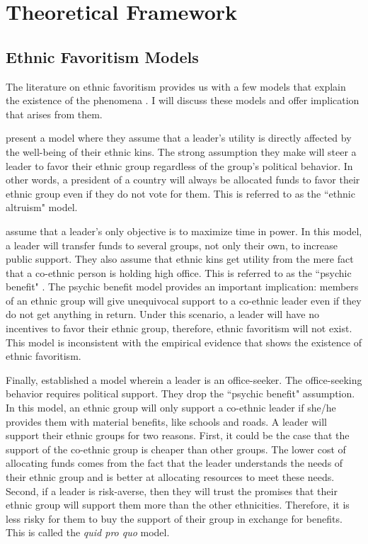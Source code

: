 \documentclass{wptemp}
\begin{document}
\section{Theoretical Framework}\label{sec1}
\subsection{Ethnic Favoritism Models}
The literature on ethnic favoritism provides us with a few models that explain the existence of the phenomena \citep{cox1986electoral, dixit1996determinants, lindbeck1987balanced}. I will discuss these models and offer implication that arises from them.

\citet{cox1986electoral} present a  model where they assume that a leader's utility is directly affected by the well-being of their ethnic kins. The strong assumption they make will steer a leader to favor their ethnic group regardless of the group's political behavior. In other words, a president of a country will always be allocated funds to favor their ethnic group even if they do not vote for them. This is referred to as the ``ethnic altruism" model.

\citet{dixit1996determinants} assume that a leader's only objective is to maximize time in power. In this model, a leader will transfer funds to several groups, not only their own, to increase public support. They also assume that ethnic kins get utility from the mere fact that a co-ethnic person is holding high office. This is referred to as the ``psychic benefit" \citep{chandra2007ethnic}. The psychic benefit model provides an important implication: members of an ethnic group will give unequivocal support to a co-ethnic leader even if they do not get anything in return. Under this scenario, a leader will have no incentives to favor their ethnic group, therefore, ethnic favoritism will not exist. This model is inconsistent with the empirical evidence that shows the existence of ethnic favoritism.

Finally, \citet{lindbeck1987balanced} established a model wherein a leader is an office-seeker. The office-seeking behavior requires political support. They drop the ``psychic benefit" assumption. In this model, an ethnic group will only support a co-ethnic leader if she/he provides them with material benefits, like schools and roads. A leader will support their ethnic groups for two reasons. First, it could be the case that the support of the co-ethnic group is cheaper than other groups. The lower cost of allocating funds comes from the fact that the leader understands the needs of their ethnic group and is better at allocating resources to meet these needs. Second, if a leader is risk-averse, then they will trust the promises that their ethnic group will support them more than the other ethnicities. Therefore, it is less risky for them to buy the support of their group in exchange for benefits. This is called the \textit{quid pro quo} model.
\end{document}
